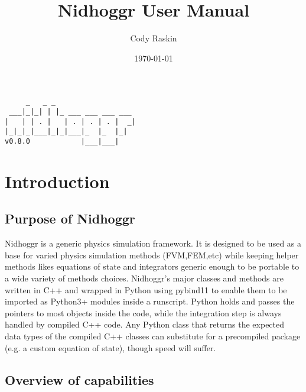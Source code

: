 \documentclass[12pt]{article}
\title{Nidhoggr User Manual}
\author{Cody Raskin}
\date{\today}
\begin{document}
	
	\maketitle
	
	\newpage
	
	\begin{center}
		\begin{verbatim}
     _   _ _
 ___|_|_| | |_ ___ ___ ___ ___
|   | | . |   | . | . | . |  _|
|_|_|_|___|_|_|___|_  |_  |_|
v0.8.0            |___|___|
		\end{verbatim}
	\end{center}
	
	\newpage
	
	\tableofcontents
	\newpage
	
	\section{Introduction}
	\subsection{Purpose of Nidhoggr}

Nidhoggr is a generic physics simulation framework. It is designed to be used as a base for varied physics simulation methods (FVM,FEM,etc) while keeping helper methods likes equations of state and integrators generic enough to be portable to a wide variety of methods choices. Nidhoggr's major classes and methods are written in C++ and wrapped in Python using pybind11 to enable them to be imported as Python3+ modules inside a runscript. Python holds and passes the pointers to most objects inside the code, while the integration step is always handled by compiled C++ code. Any Python class that returns the expected data types of the compiled C++ classes can substitute for a precompiled package (e.g. a custom equation of state), though speed will suffer. 

	\subsection{Overview of capabilities}
	
\end{document}
